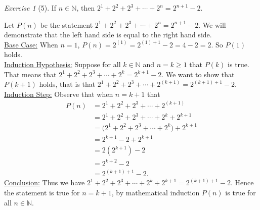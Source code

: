 \documentclass[12pt]{amsart}
\makeatletter
\theoremstyle{remark}
\newtheorem*{exercise}{Exercise}%
\def\NN{\ensuremath{\mathbb N}}
\renewenvironment{proof}[1][\proofname]{\par\doublespacing
  \pushQED{\qed}%
  \normalfont \topsep6\p@\@plus6\p@\relax
  \list{}{%
    \settowidth{\leftmargin}{\itshape\proofname:\hskip\labelsep}%
    \setlength{\labelwidth}{0pt}%
    \setlength{\itemindent}{-\leftmargin}%
  }%
  \item[\hskip\labelsep\itshape#1\@addpunct{:}]\ignorespaces
}{%
  \popQED\endlist\@endpefalse
  \singlespacing
}
\theoremstyle{mycomment}
\makeatother
\begin{document}
\begin{exercise}[5] If $n\in\NN$, then $2^{1}+2^{2}+2^{3}+\cdots+2^{n}=2^{n+1}-2$.
\begin{proof}%
  Let $P(n)$ be the statement $2^{1}+2^{2}+2^{3}+\cdots+2^{n}=2^{n+1}-2$. We will demonstrate that the left hand side is equal to the right hand side.\\
  \underline{Base Case:} When $n = 1$, $P(n) = 2^{(1)} = 2^{(1)+1} - 2 = 4 - 2 = 2$. So $P(1)$ holds. \\
  \underline{Induction Hypothesis:} Suppose for all $k\in\NN$ and $n = k \geq 1$ that $P(k)$ is true. That means that $2^{1}+2^{2}+2^{3}+\cdots+2^{k}=2^{k+1}-2$. We want to show that $P(k+1)$ holds, that is that $2^{1}+2^{2}+2^{3}+\cdots+2^{(k+1)}=2^{(k+1)+1}-2$. \\
  \underline{Induction Step:} Observe that when $n = k+1$ that 
  \begin{align*}
    P(n) &= 2^{1} + 2^{2}+2^{3} + \cdots + 2^{(k+1)} \\
         &= 2^{1} + 2^{2} + 2^{3} + \cdots + 2^{k} + 2^{k+1} \\
         &= \biggl(2^{1} + 2^{2} + 2^{3} + \cdots + 2^{k}\biggr) + 2^{k+1} \\
         &= 2^{k+1} - 2 + 2^{k+1} \\
         &= 2(2^{k+1}) - 2 \\
         &= 2^{k+2} - 2 \\
         &= 2^{(k+1)+1} - 2.
  \end{align*}
 \underline{Conclusion:} Thus we have $2^{1} + 2^{2} + 2^{3} + \cdots + 2^{k} + 2^{k+1} = 2^{(k+1)+1} - 2$. Hence the statement is true for $n = k+1$, by mathematical induction $P(n)$ is true for all $n \in \NN$.
\end{proof}
\end{exercise}
\end{document}
